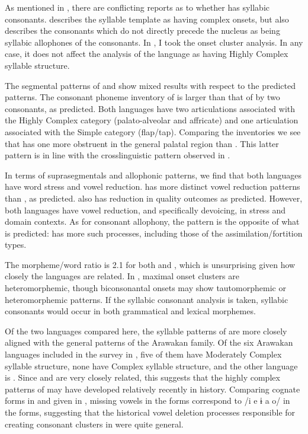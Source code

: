   As mentioned in , there are conflicting reports as to whether  has syllabic consonants. \citet{Matteson1965} describes the syllable template as having complex onsets, but also describes the consonants which do not directly precede the nucleus as being syllabic allophones of the consonants. In , I took the onset cluster analysis. In any case, it does not affect the analysis of the language as having Highly Complex syllable structure.

  The segmental patterns of  and  show mixed results with respect to the predicted patterns. The consonant phoneme inventory of  is larger than that of  by two consonants, as predicted. Both languages have two articulations associated with the Highly Complex category (palato-alveolar and affricate) and one articulation associated with the Simple category (flap/tap). Comparing the inventories we see that  has one more obstruent in the general palatal region than . This latter pattern is in line with the crosslinguistic pattern observed in .

  In terms of suprasegmentals and allophonic patterns, we find that both languages have word stress and vowel reduction.  has more distinct vowel reduction patterns than , as predicted.  also has reduction in quality outcomes as predicted. However, both languages have vowel reduction, and specifically devoicing, in stress and domain contexts. As for consonant allophony, the pattern is the opposite of what is predicted:  has more such processes, including those of the assimilation/fortition types.

  The morpheme/word ratio is 2.1 for both  and , which is unsurprising given how closely the languages are related. In , maximal onset clusters are heteromorphemic, though biconsonantal onsets may show tautomorphemic or heteromorphemic patterns. If the syllabic consonant analysis is taken, syllabic consonants would occur in both grammatical and lexical morphemes.

  Of the two languages compared here, the syllable patterns of  are more closely aligned with the general patterns of the Arawakan family. Of the six Arawakan languages included in the survey in \citet{Maddieson2013a}, five of them have Moderately Complex syllable structure, none have Complex syllable structure, and the other language is . Since  and  are very closely related, this suggests that the highly complex patterns of  may have developed relatively recently in history. Comparing cognate forms in  and  given in \citet[88-9]{Facundes2002}, missing vowels in the  forms correspond to /i e ɨ a o/ in the  forms, suggesting that the historical vowel deletion processes responsible for creating consonant clusters in  were quite general.

